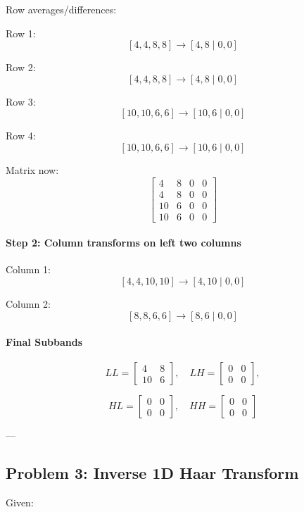 \documentclass{AnantDocumentation}
\begin{document}
Row averages/differences:

Row 1:
\[
[4,4,8,8] \rightarrow [4,8 \;|\; 0,0]
\]

Row 2:
\[
[4,4,8,8] \rightarrow [4,8 \;|\; 0,0]
\]

Row 3:
\[
[10,10,6,6] \rightarrow [10,6 \;|\; 0,0]
\]

Row 4:
\[
[10,10,6,6] \rightarrow [10,6 \;|\; 0,0]
\]

Matrix now:
\[
\begin{bmatrix}
4 & 8 & 0 & 0 \\
4 & 8 & 0 & 0 \\
10 & 6 & 0 & 0 \\
10 & 6 & 0 & 0
\end{bmatrix}
\]

\paragraph{Step 2: Column transforms on left two columns}

Column 1:
\[
[4,4,10,10] \rightarrow [4,10 \;|\; 0,0]
\]

Column 2:
\[
[8,8,6,6] \rightarrow [8,6 \;|\; 0,0]
\]

\paragraph{Final Subbands}

\[
LL =
\begin{bmatrix}
4 & 8 \\
10 & 6
\end{bmatrix},\quad
LH =
\begin{bmatrix}
0 & 0 \\
0 & 0
\end{bmatrix},
\]

\[
HL =
\begin{bmatrix}
0 & 0 \\
0 & 0
\end{bmatrix},\quad
HH =
\begin{bmatrix}
0 & 0 \\
0 & 0
\end{bmatrix}
\]

---

\subsection*{Problem 3: Inverse 1D Haar Transform}

Given:
\end{document}
